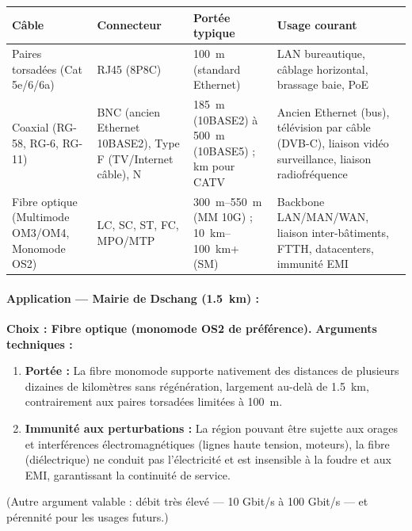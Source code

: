 \documentclass[11pt]{article}
\newcommand{\cle}[1]{{\popxbold\color{popdark}#1}}
\begin{document}
\begin{corrige}
\begin{center}
\begin{tabularx}{\linewidth}{|l|X|X|X|}
\hline
\rowcolor{popblueL} \textbf{Câble} & \textbf{Connecteur} & \textbf{Portée typique} & \textbf{Usage courant} \\
\hline
\cle{Paires torsadées} (Cat 5e/6/6a) & \cle{RJ45} (8P8C) & \SI{100}{m} (standard Ethernet) & LAN bureautique, câblage horizontal, brassage baie, PoE \\
\hline
\cle{Coaxial} (RG-58, RG-6, RG-11) & \cle{BNC} (ancien Ethernet 10BASE2), Type F (TV/Internet câble), N & \SI{185}{m} (10BASE2) à \SI{500}{m} (10BASE5) ; km pour CATV & Ancien Ethernet (bus), télévision par câble (DVB-C), liaison vidéo surveillance, liaison radiofréquence \\
\hline
\cle{Fibre optique} (Multimode OM3/OM4, Monomode OS2) & LC, SC, ST, FC, MPO/MTP & \SI{300}{m}--\SI{550}{m} (MM 10G) ; \SI{10}{km}--\SI{100}{km}+ (SM) & Backbone LAN/MAN/WAN, liaison inter-bâtiments, FTTH, datacenters, immunité EMI \\
\hline
\end{tabularx}
\end{center}

\paragraph{Application — Mairie de Dschang (\SI{1,5}{km}) :}
\textbf{Choix : Fibre optique (monomode OS2 de préférence).}
\textbf{Arguments techniques :}
\begin{enumerate}
  \item \textbf{Portée :} La fibre monomode supporte nativement des distances de plusieurs dizaines de kilomètres sans régénération, largement au-delà de \SI{1,5}{km}, contrairement aux paires torsadées limitées à \SI{100}{m}.
  \item \textbf{Immunité aux perturbations :} La région pouvant être sujette aux orages et interférences électromagnétiques (lignes haute tension, moteurs), la fibre (diélectrique) ne conduit pas l'électricité et est insensible à la foudre et aux EMI, garantissant la continuité de service.
\end{enumerate}
(Autre argument valable : débit très élevé — 10 Gbit/s à 100 Gbit/s — et pérennité pour les usages futurs.)
\end{corrige}
\end{document}
